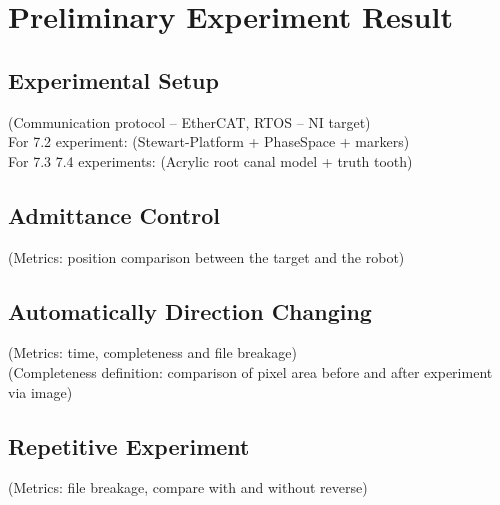 \chapter{Preliminary Experiment Result}
\section{Experimental Setup}
(Communication protocol – EtherCAT, RTOS – NI target)						\\
For 7.2 experiment: (Stewart-Platform + PhaseSpace + markers)				\\
For 7.3 7.4 experiments: (Acrylic root canal model + truth tooth)
\section{Admittance Control}
(Metrics: position comparison between the target and the robot)
\section{Automatically Direction Changing}
(Metrics: time, completeness and file breakage)								\\
(Completeness definition: comparison of pixel area before and after experiment via image)
\section{Repetitive Experiment}
(Metrics: file breakage, compare with and without reverse)